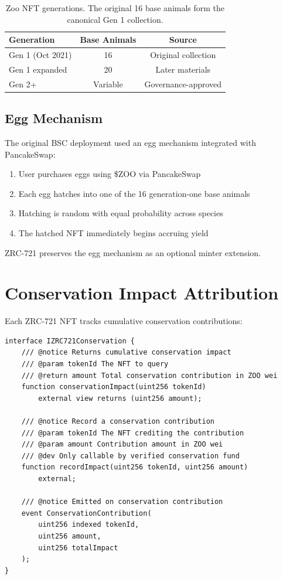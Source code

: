 \documentclass[11pt,letterpaper]{article}
\begin{document}
\begin{table}[t]
\centering
\begin{tabular}{lcc}
\toprule
\textbf{Generation} & \textbf{Base Animals} & \textbf{Source} \\
\midrule
Gen 1 (Oct 2021) & 16 & Original collection \\
Gen 1 expanded & 20 & Later materials \\
Gen 2+ & Variable & Governance-approved \\
\bottomrule
\end{tabular}
\caption{Zoo NFT generations. The original 16 base animals form the canonical Gen 1 collection.}
\label{tab:generations}
\end{table}

\subsection{Egg Mechanism}

The original BSC deployment used an egg mechanism integrated with PancakeSwap:

\begin{enumerate}
    \item User purchases eggs using \$ZOO via PancakeSwap
    \item Each egg hatches into one of the 16 generation-one base animals
    \item Hatching is random with equal probability across species
    \item The hatched NFT immediately begins accruing yield
\end{enumerate}

ZRC-721 preserves the egg mechanism as an optional minter extension.

\section{Conservation Impact Attribution}
\label{sec:conservation}

Each ZRC-721 NFT tracks cumulative conservation contributions:

\begin{lstlisting}[language=Solidity,caption=ZRC-721 Conservation Interface]
interface IZRC721Conservation {
    /// @notice Returns cumulative conservation impact
    /// @param tokenId The NFT to query
    /// @return amount Total conservation contribution in ZOO wei
    function conservationImpact(uint256 tokenId)
        external view returns (uint256 amount);

    /// @notice Record a conservation contribution
    /// @param tokenId The NFT crediting the contribution
    /// @param amount Contribution amount in ZOO wei
    /// @dev Only callable by verified conservation fund
    function recordImpact(uint256 tokenId, uint256 amount)
        external;

    /// @notice Emitted on conservation contribution
    event ConservationContribution(
        uint256 indexed tokenId,
        uint256 amount,
        uint256 totalImpact
    );
}
\end{lstlisting}
\end{document}
